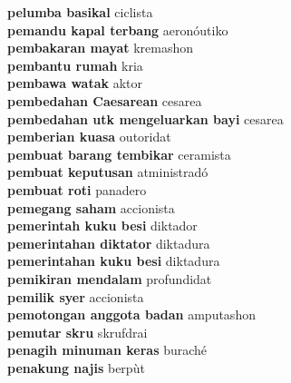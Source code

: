 \textbf{ pelumba basikal  } ciclista \\
\textbf{ pemandu kapal terbang  } aeronóutiko \\
\textbf{ pembakaran mayat  } kremashon \\
\textbf{ pembantu rumah  } kria \\
\textbf{ pembawa watak  } aktor \\
\textbf{ pembedahan Caesarean  } cesarea \\
\textbf{ pembedahan utk mengeluarkan bayi  } cesarea \\
\textbf{ pemberian kuasa  } outoridat \\
\textbf{ pembuat barang tembikar  } ceramista \\
\textbf{ pembuat keputusan  } atministradó \\
\textbf{ pembuat roti  } panadero \\
\textbf{ pemegang saham  } accionista \\
\textbf{ pemerintah kuku besi  } diktador \\
\textbf{ pemerintahan diktator  } diktadura \\
\textbf{ pemerintahan kuku besi  } diktadura \\
\textbf{ pemikiran mendalam  } profundidat \\
\textbf{ pemilik syer  } accionista \\
\textbf{ pemotongan anggota badan  } amputashon \\
\textbf{ pemutar skru  } skrufdrai \\
\textbf{ penagih minuman keras  } buraché \\
\textbf{ penakung najis  } berpùt \\
